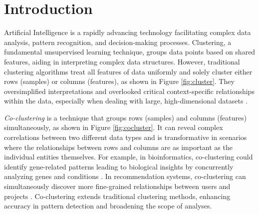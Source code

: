 
\section{Introduction}
Artificial Intelligence is a rapidly advancing technology facilitating complex data analysis, pattern recognition, and decision-making processes. Clustering, a fundamental unsupervised learning technique, groups data points based on shared features, aiding in interpreting complex data structures. However, traditional clustering algorithms \cite{zhang2023AdaptiveGraphConvolution, wu2023EffectiveClusteringStructured} treat all features of data uniformly and solely cluster either rows (samples) or columns (features),  as shown in Figure \ref{fig:cluster}. They oversimplified interpretations and overlooked critical context-specific relationships within the data, especially when dealing with large, high-dimensional datasets \cite{chen2023FastFlexibleBipartite, zhao2023MultiviewCoclusteringMultisimilarity, kumar2023CoclusteringBasedMethods}.

\textit{Co-clustering} \cite{kluger2003SpectralBiclusteringMicroarray, yan2017CoclusteringMultidimensionalBig} is a technique that groups rows (samples) and columns (features) simultaneously, as shown in Figure \ref{fig:cocluster}. It can reveal complex correlations between two different data types and is transformative in scenarios where the relationships between rows and columns are as important as the individual entities themselves. For example, in bioinformatics, co-clustering could identify gene-related patterns leading to biological insights by concurrently analyzing genes and conditions \cite{higham2007SpectralClusteringIts, kluger2003SpectralBiclusteringMicroarray, zhao2012BiclusteringAnalysisPattern}. In recommendation systems, co-clustering can simultaneously discover more fine-grained relationships between users and projects \cite{dhillon2007WeightedGraphCuts, chen2023ParallelNonNegativeMatrix}. Co-clustering extends traditional clustering methods, enhancing accuracy in pattern detection and broadening the scope of analyses.

